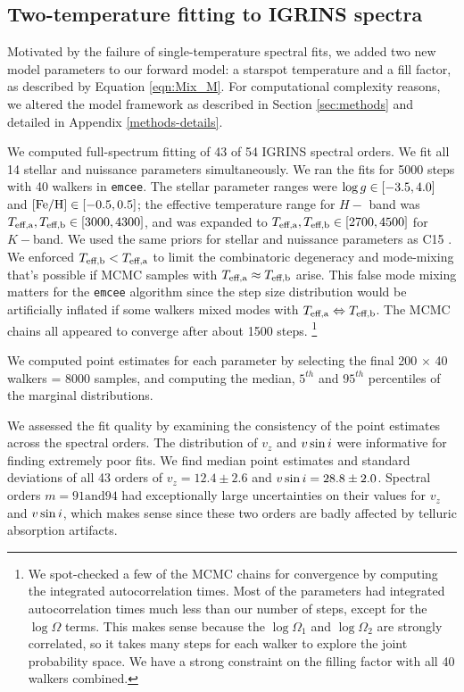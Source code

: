 \documentclass[twocolumn]{emulateapj}%
\newcommand{\iancze}{{\sc C15 }}
\begin{document}
\subsection{Two-temperature fitting to IGRINS spectra}

Motivated by the failure of single-temperature spectral fits, we added two new model parameters to our forward model: a starspot temperature and a fill factor, as described by Equation \ref{eqn:Mix_M}.  For computational complexity reasons, we altered the model framework as described in Section \ref{sec:methods} and detailed in Appendix \ref{methods-details}.  

We computed full-spectrum fitting of 43 of 54 IGRINS spectral orders.  We fit all 14 stellar and nuissance parameters simultaneously.  We ran the fits for 5000 steps with 40 walkers in \texttt{emcee}.  The stellar parameter ranges were $\log g \in [-3.5, 4.0]$ and $[{\rm Fe}/{\rm H}] \in [-0.5, 0.5]$; the effective temperature range for $H-$ band was $T_\textrm{eff,a}, T_\textrm{eff,b} \in [3000, 4300]$, and was expanded to $T_\textrm{eff,a}, T_\textrm{eff,b} \in [2700, 4500]$ for $K-$band.  We used the same priors for stellar and nuissance parameters as \iancze.  We enforced $T_\textrm{eff,b} < T_\textrm{eff,a}$ to limit the combinatoric degeneracy and mode-mixing that's possible if MCMC samples with $T_\textrm{eff,a} \approx T_\textrm{eff,b}$ arise.  This false mode mixing matters for the \texttt{emcee} algorithm since the step size distribution would be artificially inflated if some walkers mixed modes with $T_\textrm{eff,a} \Leftrightarrow T_\textrm{eff,b}$.  The MCMC chains all appeared to converge after about 1500 steps.  \footnote{We spot-checked a few of the MCMC chains for convergence by computing the integrated autocorrelation times.  Most of the parameters had integrated autocorrelation times much less than our number of steps, except for the $\log{\Omega}$ terms.  This makes sense because the $\log{\Omega_1}$ and $\log{\Omega_2}$ are strongly correlated, so it takes many steps for each walker to explore the joint probability space.  We have a strong constraint on the filling factor with all 40 walkers combined.}


We computed point estimates for each parameter by selecting the final 200 $\times$ 40 walkers = 8000 samples, and computing the median, $5^{th}$ and $95^{th}$ percentiles of the marginal distributions.

We assessed the fit quality by examining the consistency of the point estimates across the spectral orders.  The distribution of $v_z$ and $v \sin i$ were informative for finding extremely poor fits.  We find median point estimates and standard deviations of all 43 orders of $v_z = 12.4 \pm 2.6$ and $v \sin i = 28.8 \pm 2.0$.  Spectral orders $m=91 \mathrm{ and }94$ had exceptionally large uncertainties on their values for $v_z$ and $v \sin i$, which makes sense since these two orders are badly affected by telluric absorption artifacts.
\end{document}

